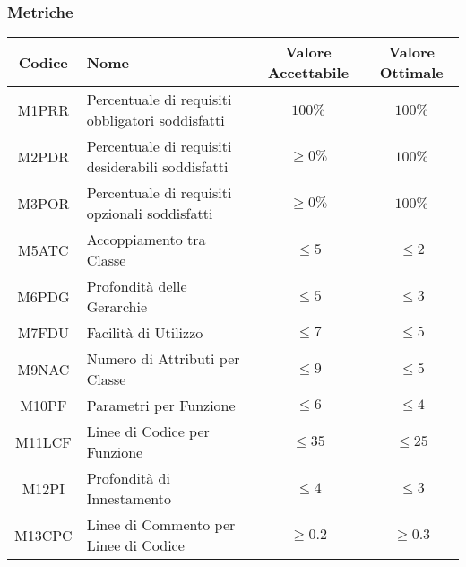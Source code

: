 \subsubsection{Metriche}
\begin{center}
	\renewcommand{\arraystretch}{1.8}
	\begin{tabular}{ |c|m{14em}|c|c|}
		\hline
		\textbf{Codice} & \textbf{Nome} & \textbf{Valore Accettabile} & \textbf{Valore Ottimale} \\
		\hline
		M1PRR & Percentuale di requisiti obbligatori soddisfatti & $ 100\% $ & $ 100\% $ \\
		\hline
		M2PDR & Percentuale di requisiti desiderabili soddisfatti & $ \geq 0\% $ & $ 100\% $ \\
		\hline
		M3POR & Percentuale di requisiti opzionali soddisfatti & $ \geq 0\% $ & $ 100\% $ \\
		\hline
		M5ATC & Accoppiamento tra Classe & $ \leq 5 $ & $ \leq 2 $\\
		\hline
		M6PDG & Profondità delle Gerarchie & $ \leq 5 $ & $ \leq 3 $\\
		\hline
		M7FDU & Facilità di Utilizzo & $ \leq 7 $ & $ \leq 5 $\\
		\hline
		M9NAC & Numero di Attributi per Classe & $ \leq 9 $ & $ \leq 5 $\\
		\hline
		M10PF & Parametri per Funzione & $ \leq 6 $ & $ \leq 4 $\\
		\hline
		M11LCF & Linee di Codice per Funzione & $ \leq 35 $ & $ \leq 25 $\\
		\hline
		M12PI & Profondità di Innestamento & $ \leq 4 $ & $ \leq 3 $\\
		\hline
		M13CPC & Linee di Commento per Linee di Codice & $ \geq 0.2 $ & $ \geq 0.3 $\\
		\hline
	\end{tabular}
\end{center}